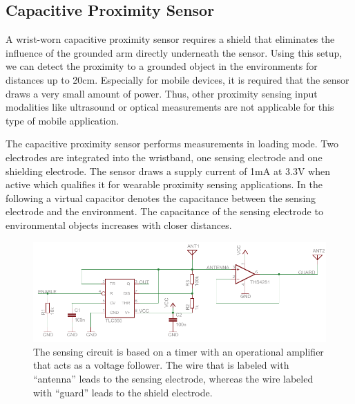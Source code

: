 \documentclass[runningheads,a4paper]{llncs}
\begin{document}
\subsection{Capacitive Proximity Sensor}

A wrist-worn capacitive proximity sensor requires a shield that eliminates the influence of the grounded arm directly underneath the sensor. Using this setup, we can detect the proximity to a grounded object in the environments for distances up to 20cm. Especially for mobile devices, it is required that the sensor draws a very small amount of power. Thus, other proximity sensing input modalities like ultrasound or optical measurements are not applicable for this type of mobile application.

The capacitive proximity sensor performs measurements in loading mode. Two electrodes are integrated into the wristband, one sensing electrode and one shielding electrode. The sensor draws a supply current of 1mA at 3.3V when active which qualifies it for wearable proximity sensing applications. In the following a virtual capacitor denotes the capacitance between the sensing electrode and the environment. The capacitance of the sensing electrode to environmental objects increases with closer distances.

\begin{figure}
	\centering
		\includegraphics[width=1.00\textwidth]{Images/schematic.pdf}
	\caption{The sensing circuit is based on a timer with an operational amplifier that acts as a voltage follower. The wire that is labeled with ``antenna'' leads to the sensing electrode, whereas the wire labeled with ``guard'' leads to the shield electrode.}
	\label{fig:schematic}
\end{figure}
\end{document}
